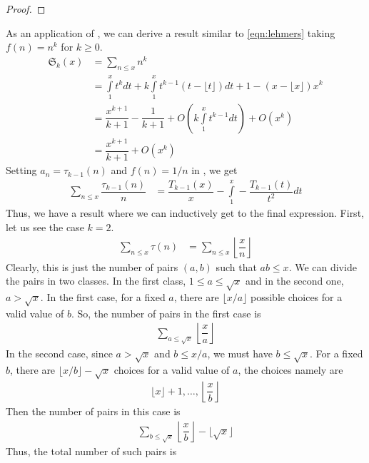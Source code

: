 \documentclass[elemannt.tex]{subfile}
\begin{document}
		\begin{proof}
			
		\end{proof}
	As an application of , we can derive a result similar to \ref{eqn:lehmers} taking  $f(n)=n^{k}$ for $k\geq 0$.
		\begin{align*}
			\mathfrak{S}_{k}(x)
				& = \sum_{n\leq x}n^{k}\\
				& = \int\limits_{1}^{x}t^{k}dt+k\int\limits_{1}^{x}t^{k-1}(t-\lfloor{t}\rfloor)dt+1-(x-\lfloor{x}\rfloor)x^{k}\\
				& = \dfrac{x^{k+1}}{k+1}-\dfrac{1}{k+1}+O\left(k\int\limits_{1}^{x}t^{k-1}dt\right)+O(x^{k})\\
				& = \dfrac{x^{k+1}}{k+1}+O(x^{k})
		\end{align*}
	Setting $a_{n}=\tau_{k-1}(n)$ and $f(n)=1/n$ in , we get
		\begin{align*}
			\sum_{n\leq x}\dfrac{\tau_{k-1}(n)}{n}
				& = \dfrac{T_{k-1}(x)}{x}-\int\limits_{1}^{x}-\dfrac{T_{k-1}(t)}{t^{2}}dt
		\end{align*}
	Thus, we have a result where we can inductively get to the final expression. First, let us see the case $k=2$.
		\begin{align*}
			\sum_{n\leq x}\tau(n)
				& = \sum_{n\leq x}\left\lfloor{\dfrac{x}{n}}\right\rfloor
		\end{align*}
	Clearly, this is just the number of pairs $(a,b)$ such that $ab\leq x$. We can divide the pairs in two classes. In the first class, $1\leq a\leq \sqrt{x}$ and in the second one, $a>\sqrt{x}$. In the first case, for a fixed $a$, there are $\lfloor{x/a}\rfloor$ possible choices for a valid value of $b$. So, the number of pairs in the first case is
		\begin{align*}
			\sum_{a\leq \sqrt{x}}\left\lfloor{\dfrac{x}{a}}\right\rfloor
		\end{align*}
	In the second case, since $a>\sqrt{x}$ and $b\leq x/a$, we must have $b\leq \sqrt{x}$. For a fixed $b$, there are $\lfloor{x/b}\rfloor-\sqrt{x}$ choices for a valid value of $a$, the choices namely are
		\begin{align*}
			\lfloor{x}\rfloor+1,\ldots,\left\lfloor{\dfrac{x}{b}}\right\rfloor
		\end{align*}
	Then the number of pairs in this case is
		\begin{align*}
			\sum_{b\leq \sqrt{x}}\left\lfloor{\dfrac{x}{b}}\right\rfloor-\lfloor{\sqrt{x}}\rfloor
		\end{align*}
	Thus, the total number of such pairs is
\end{document}
